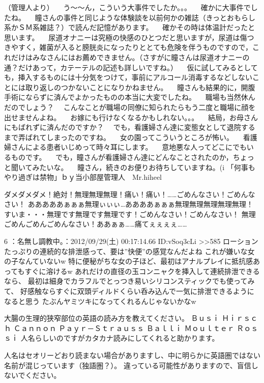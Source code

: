 （管理人より） 
　う～～ん，こういう大事件でしたか。。。 
　確かに大事件でしたね。 
　瞳さんの事件と同じような体験談を以前何かの雑誌（きっとおもらし系かＳＭ系雑誌？）で読んだ記憶があります。 
　確かその時は体温計だったと思います。 
　尿道オナニーは究極の快感のひとつだと思いますが，尿道は傷つきやすく，雑菌が入ると膀胱炎になったりととても危険を伴うものですので，これだけはみなさんにはお薦めできません。（さすがに瞳さんは尿道オナニーの通？だけあって，カテーテルの記述も詳しいですね。） 
　仮に試してみるとしても，挿入するものには十分気をつけて，事前にアルコール消毒するなどしないことには取り返しのつかないことになりかねません。 
　瞳さんも結果的に，開腹手術にならずに済んでよかったものの本当に大変でしたね。 
　職場も当然休んだのでしょう？ 
　こんなことが職場の同僚に知られたらもう二度と職場に顔を出せませんよね。 
　お嫁にも行けなくなるかもしれない。。。 
　結局，お母さんにもばれずに済んだのですか？ 
　でも，看護婦さん達に変態女として退院するまで弄ばれてしまったのですね。 
　女の園ってこういうところが怖い。 
　看護婦さんによる患者いじめって時々耳にします。 
　意地悪な人ってどこにでもいるものです。 
　でも，瞳さんが看護婦さん達にどんなことされたのか，ちょっと聞いてみたいな。 
　瞳さん，続きのお便りお待ちしていますね。(^^) 
「何事もやり過ぎは禁物」ｂｙ当小部屋管理人　Mr.hiheel




ダメダメダメ！絶対！無理無理無理！痛い！痛い！……ごめんなさい！ごめんなさい！ 
あああああぁぁぁ無理ぃぃぃ…ああああぁぁぁ無理無理無理無理無理！ 
すいま・・・無理です無理です無理です！ごめんなさい！ごめんなさい！ 
無理ごめんごめんごめんなさい！ああぁぁ……痛てぇぇぇぇ……

6 ：名無し調教中。：2012/09/29(土) 00:17:14.66 ID:vSoq3cLi
>>585 
ローションたっぷりの連続的な排泄感って、要は”快便”の感覚なんだよね 
これが嫌いな女の子なんていないw 
特に便秘がちな女の子ほど、最初はアナルプレイに抵抗感あってもすぐに溶けるw 
あれだけの直径の玉コンニャクを挿入して連続排泄できるなら、 
最初は細身でカラフルでとっつき易いシリコンスティックでも使ってみて、 
好感触ならすぐに双頭ディルドくらい呑み込んで一気に排泄できるようになると思う 
たぶんヤミツキになってくれるんじゃないかなw






大腸の生理的狭窄部位の英語の読み方を教えてください。
Ｂｕｓｉ
Ｈｉｒｓｃｈ
Ｃａｎｎｏｎ
Ｐａｙｒ－Ｓｔｒａｕｓｓ
Ｂａｌｌｉ
Ｍｏｕｌｔｅｒ
Ｒｏｓｓｉ
人名らしいのですがカタカナ読みにしてくれると助かります。

 

人名はセオリーどおり読まない場合がありますし、中に明らかに英語圏ではない名前が混じっています（独語圏？）。
違っている可能性がありますので、盲信しないでください。

